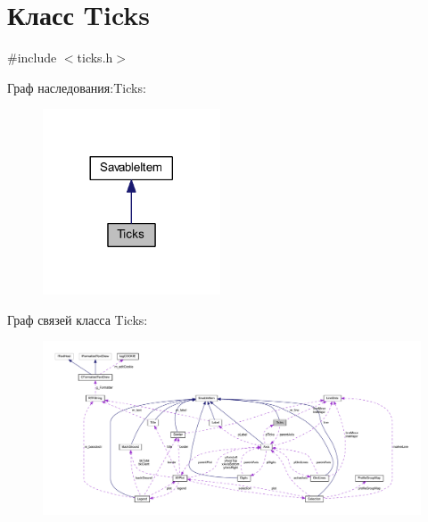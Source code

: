 \hypertarget{class_ticks}{\section{Класс Ticks}
\label{class_ticks}
}


{\ttfamily \#include $<$ticks.\-h$>$}



Граф наследования\-:Ticks\-:
\nopagebreak
\begin{figure}[H]
\begin{center}
\leavevmode
\includegraphics[width=149pt]{class_ticks__inherit__graph}
\end{center}
\end{figure}


Граф связей класса Ticks\-:
\nopagebreak
\begin{figure}[H]
\begin{center}
\leavevmode
\includegraphics[width=350pt]{class_ticks__coll__graph}
\end{center}
\end{figure}
